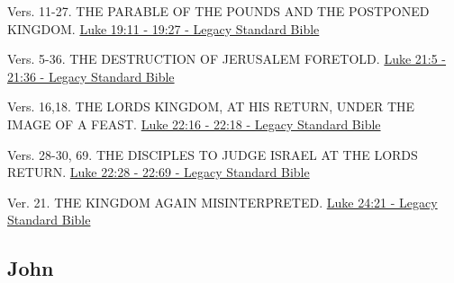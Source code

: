 \documentclass[
  ignorenonframetext,
]{beamer}
\begin{document}
\begin{frame}{19}
\label{section-175}
\begin{block}{Vers. 11-27. THE PARABLE OF THE POUNDS AND THE POSTPONED
KINGDOM.}
\label{vers.-11-27.-the-parable-of-the-pounds-and-the-postponed-kingdom.}
\href{https://read.lsbible.org/?q=lk19\%3A11-27}{Luke 19:11 - 19:27 -
Legacy Standard Bible}
\end{block}
\end{frame}

\begin{frame}{21}
\label{section-176}
\begin{block}{Vers. 5-36. THE DESTRUCTION OF JERUSALEM FORETOLD.}
\label{vers.-5-36.-the-destruction-of-jerusalem-foretold.}
\href{https://read.lsbible.org/?q=lk21\%3A5-36}{Luke 21:5 - 21:36 -
Legacy Standard Bible}
\end{block}
\end{frame}

\begin{frame}{22}
\label{section-177}
\begin{block}{Vers. 16,18. THE LORD\textquotesingle S KINGDOM, AT HIS
RETURN, UNDER THE IMAGE OF A FEAST.}
\label{vers.-1618.-the-lords-kingdom-at-his-return-under-the-image-of-a-feast.}
\href{https://read.lsbible.org/?q=lk22\%3A16-18}{Luke 22:16 - 22:18 -
Legacy Standard Bible}
\end{block}

\begin{block}{Vers. 28-30, 69. THE DISCIPLES TO JUDGE ISRAEL AT THE
LORD\textquotesingle S RETURN.}
\label{vers.-28-30-69.-the-disciples-to-judge-israel-at-the-lords-return.}
\href{https://read.lsbible.org/?q=lk22\%3A28-69}{Luke 22:28 - 22:69 -
Legacy Standard Bible}
\end{block}
\end{frame}

\begin{frame}{24}
\label{section-178}
\begin{block}{Ver. 21. THE KINGDOM AGAIN MISINTERPRETED.}
\label{ver.-21.-the-kingdom-again-misinterpreted.}
\href{https://read.lsbible.org/?q=lk24\%3A21}{Luke 24:21 - Legacy
Standard Bible}
\end{block}
\end{frame}

\subsection{John}\label{john}
\end{document}
